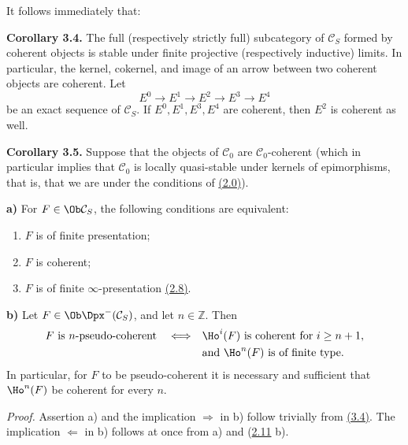 It follows immediately that:

\textbf{Corollary 3.4.} The full (respectively strictly full) subcategory of \(\mathcal C_S\) formed by coherent objects is stable under finite projective (respectively inductive) limits. In particular, the kernel, cokernel, and image of an arrow between two coherent objects are coherent. Let
\[
  E^0\longrightarrow E^1\longrightarrow E^2\longrightarrow E^3\longrightarrow E^4
\]
be an exact sequence of \(\mathcal C_S\). If \(E^0,E^1,E^3,E^4\) are coherent, then \(E^2\) is coherent as well.

\textbf{Corollary 3.5.} Suppose that the objects of \(\mathcal C_0\) are \(\mathcal C_0\)-coherent (which in particular implies that \(\mathcal C_0\) is locally quasi-stable under kernels of epimorphisms, that is, that we are under the conditions of \hyperlink{sga6.e01.para.2-0}{(2.0)}).

\textbf{a)} For \(F\in\Ob\mathcal C_S\), the following conditions are equivalent:
\begin{enumerate}[label=(\roman*)]
\item \(F\) is of finite presentation;
\item \(F\) is coherent;
\item \(F\) is of finite \(\infty\)-presentation \hyperlink{sga6.e01.def.2-8}{(2.8)}.
\end{enumerate}

\textbf{b)} Let \(F\in\Ob\Dpx^-(\mathcal C_S)\), and let \(n\in\mathbb Z\). Then
\[
\begin{split}
F\text{ is }n\text{-pseudo-coherent}
\quad\Longleftrightarrow\quad&
\Ho^i(F)\text{ is coherent for }i\geq n+1,\\
&\text{and }\Ho^n(F)\text{ is of finite type.}
\end{split}
\]
In particular, for \(F\) to be pseudo-coherent it is necessary and sufficient that \(\Ho^n(F)\) be coherent for every \(n\).

\emph{Proof.} Assertion a) and the implication \(\Rightarrow\) in b) follow trivially from \hyperlink{sga6.e01.cor.3-4}{(3.4)}. The implication \(\Leftarrow\) in b) follows at once from a) and (\hyperlink{sga6.e01.prop.2-11}{2.11} b).

